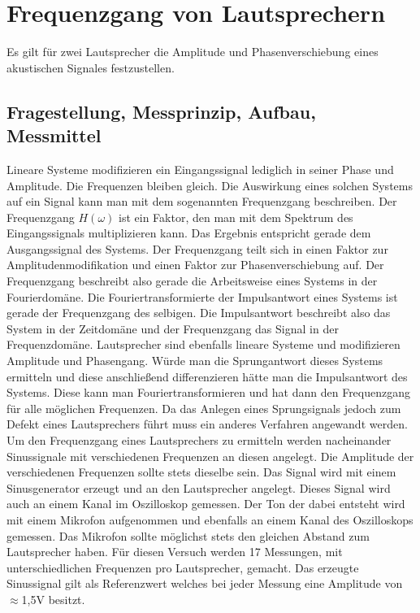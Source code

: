 %
%
\chapter{Frequenzgang von Lautsprechern}
Es gilt für zwei Lautsprecher die Amplitude und Phasenverschiebung eines akustischen Signales festzustellen.

\label{chap:FrequenzgangVonLautsprechern}

\section{Fragestellung, Messprinzip, Aufbau, Messmittel}
Lineare Systeme modifizieren ein Eingangssignal lediglich in seiner Phase und Amplitude. Die Frequenzen bleiben gleich. Die Auswirkung eines solchen Systems auf ein Signal kann man mit dem sogenannten Frequenzgang beschreiben. Der Frequenzgang $H(\omega)$ ist ein Faktor, den man mit dem Spektrum des Eingangssignals multiplizieren kann. Das Ergebnis entspricht gerade dem Ausgangssignal des Systems.  Der Frequenzgang teilt sich in einen Faktor zur Amplitudenmodifikation und einen Faktor zur Phasenverschiebung auf. Der Frequenzgang beschreibt also gerade die Arbeitsweise eines Systems in der Fourierdomäne.
Die Fouriertransformierte der Impulsantwort eines Systems ist gerade der Frequenzgang des selbigen. Die Impulsantwort beschreibt also das System in der Zeitdomäne und der Frequenzgang das Signal in der Frequenzdomäne.
Lautsprecher sind ebenfalls lineare Systeme und modifizieren Amplitude und Phasengang. Würde man die Sprungantwort dieses Systems ermitteln und diese anschließend differenzieren hätte man die Impulsantwort des Systems. Diese kann man Fouriertransformieren und hat dann den Frequenzgang für alle möglichen Frequenzen. Da das Anlegen eines Sprungsignals jedoch zum Defekt eines Lautsprechers führt muss ein anderes Verfahren angewandt werden. 
Um den Frequenzgang eines Lautsprechers zu ermitteln werden nacheinander Sinussignale mit verschiedenen Frequenzen an diesen angelegt. Die Amplitude der verschiedenen Frequenzen sollte stets dieselbe sein. Das Signal wird mit einem Sinusgenerator erzeugt und an den Lautsprecher angelegt. Dieses Signal wird auch an einem Kanal im Oszilloskop gemessen. Der Ton der dabei entsteht wird mit einem Mikrofon aufgenommen und ebenfalls an einem Kanal des Oszilloskops gemessen. Das Mikrofon sollte möglichst stets den gleichen Abstand zum Lautsprecher haben.
Für diesen Versuch werden 17 Messungen, mit unterschiedlichen Frequenzen pro Lautsprecher, gemacht.
Das erzeugte Sinussignal gilt als Referenzwert welches bei jeder Messung eine Amplitude von $\approx$1,5V besitzt.
